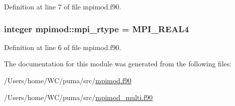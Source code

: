 \-Definition at line 7 of file mpimod.\-f90.

\hypertarget{classmpimod_a5a2316efc68e8c325c7f02c3e5038e9e}{
\subsubsection[{mpi\-\_\-rtype}]{\setlength{\rightskip}{0pt plus 5cm}integer {\bf mpimod\-::mpi\-\_\-rtype} = \-M\-P\-I\-\_\-\-R\-E\-A\-L4}}
\label{classmpimod_a5a2316efc68e8c325c7f02c3e5038e9e}


\-Definition at line 6 of file mpimod.\-f90.



\-The documentation for this module was generated from the following files\-:\begin{DoxyCompactItemize}
\item 
/\-Users/home/\-W\-C/puma/src/\hyperlink{mpimod_8f90}{mpimod.\-f90}\item 
/\-Users/home/\-W\-C/puma/src/\hyperlink{mpimod__multi_8f90}{mpimod\-\_\-multi.\-f90}\end{DoxyCompactItemize}
